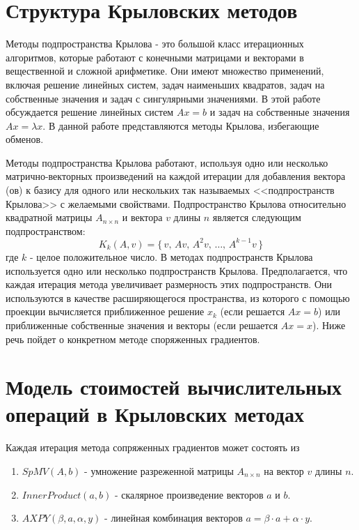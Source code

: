 \documentclass[a4paper,12pt]{report}
\begin{document}
    \section{ Структура Крыловских методов }
    Методы подпространства Крылова - это большой класс итерационных алгоритмов, которые работают с конечными матрицами и векторами в вещественной и сложной арифметике. Они имеют множество применений, включая решение линейных систем, задач наименьших квадратов, задач на собственные значения и задач с сингулярными значениями. В этой работе обсуждается решение линейных систем $Ax = b$ и задач на собственные значения $Ax = \lambda x$. В данной работе представляются методы Крылова, избегающие обменов.

    Методы подпространства Крылова работают, используя одно или несколько матрично-векторных произведений на каждой итерации для добавления вектора (ов) к базису для одного или нескольких так называемых <<подпространств Крылова>> с желаемыми свойствами. Подпространство Крылова относительно квадратной матрицы $A_{n \times n}$ и вектора $v$ длины $n$ является следующим подпространством:
    $$ K_k(A, v) = \{\, v,\, Av,\, A^2v,\, \ldots,\, A^{k-1}v\, \}$$
    где $k$ - целое положительное число. В методах подпространств Крылова используется одно или несколько подпространств Крылова. Предполагается, что каждая итерация метода увеличивает размерность этих подпространств. Они используются в качестве расширяющегося пространства, из которого с помощью проекции вычисляется приближенное решение $x_k$ (если решается $Ax = b$) или приближенные собственные значения и векторы (если решается $Ax = x$). Ниже речь пойдет о конкретном методе споряженных градиентов.
    
    \section{ Модель стоимостей вычислительных операций в Крыловских методах }
    Каждая итерация метода сопряженных градиентов может состоять из
    \begin{enumerate}
        \item $SpMV(A, b)$ - умножение разреженной матрицы $A_{n \times n}$ на вектор $v$ длины $n$.
        \item $InnerProduct(a, b)$ - скалярное произведение векторов $a$ и $b$.
        \item $AXPY(\beta, a, \alpha, y)$ - линейная комбинация векторов $a = \beta \cdot a + \alpha \cdot y$. 
    \end{enumerate}
\end{document}

